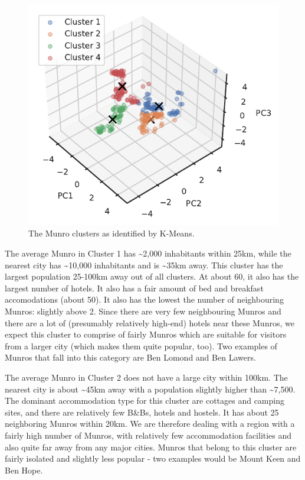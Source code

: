 \documentclass[11pt,a4paper]{article}
\begin{document}
\begin{figure} [h!]
  \centering
  \includegraphics{report/3d_clusters.pdf}
  \caption{The Munro clusters as identified by K-Means.}
  \label{fds-project-template:fig:3d_clusters}
\end{figure}
The average Munro in Cluster 1 has \textasciitilde 2,000 inhabitants within 25km, while the nearest city has \textasciitilde 10,000 inhabitants and is \textasciitilde 35km away. This cluster has the largest population 25-100km away out of all clusters. At about 60, it also has the largest number of hotels. It also has a fair amount of bed and breakfast accomodations (about 50). It also has the lowest the number of neighbouring Munros: slightly above 2. Since there are very few neighbouring Munros and there are a lot of (presumably relatively high-end) hotels near these Munros, we expect this cluster to comprise of fairly  Munros which are suitable for visitors from a larger city (which makes them quite popular, too). Two examples of Munros that fall into this category are Ben Lomond and Ben Lawers.

The average Munro in Cluster 2 does not have a large city within 100km. The nearest city is about \textasciitilde 45km away with a population slightly higher than \textasciitilde 7,500. The dominant accommodation type for this cluster are cottages and camping sites, and there are relatively few B\&Bs, hotels and hostels. It has about 25 neighboring Munros within 20km. We are therefore dealing with a region with a fairly high number of Munros, with relatively few accommodation facilities and also quite far away from any major cities. Munros that belong to this cluster are fairly isolated and slightly less popular - two examples would be Mount Keen and Ben Hope.
\end{document}
